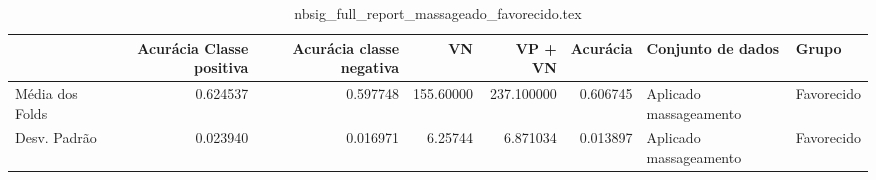 \begin{table}
\centering
\caption{nbsig_full_report_massageado_favorecido.tex}
\label{nbsig_full_report_massageado_favorecido.tex}
\begin{tabular}{lrrrrrll}
\toprule
{} &  Acurácia Classe positiva &  Acurácia classe negativa &        VN  &    VP + VN  &  Acurácia &       Conjunto de dados &       Grupo \\
\midrule
Média dos Folds &                  0.624537 &                  0.597748 &  155.60000 &  237.100000 &  0.606745 &  Aplicado massageamento &  Favorecido \\
Desv. Padrão    &                  0.023940 &                  0.016971 &    6.25744 &    6.871034 &  0.013897 &  Aplicado massageamento &  Favorecido \\
\bottomrule
\end{tabular}
\end{table}
